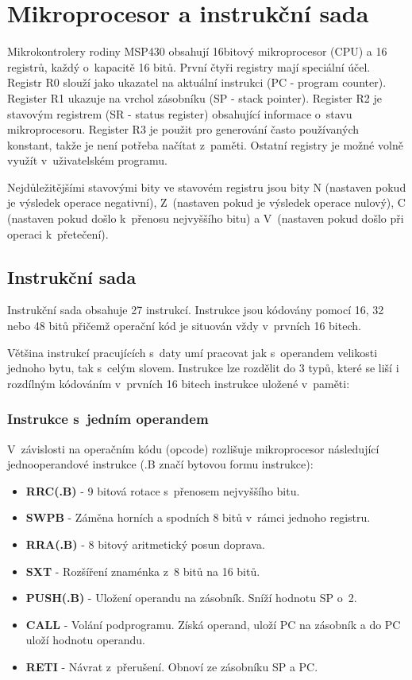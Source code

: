 \section{Mikroprocesor a instrukční sada}

Mikrokontrolery rodiny MSP430 obsahují 16bitový mikroprocesor (CPU) a 16 registrů, každý o~kapacitě 16 bitů. První čtyři registry mají speciální účel. Registr R0 slouží jako ukazatel na aktuální instrukci (PC - program counter). Register R1 ukazuje na vrchol zásobníku (SP - stack pointer). Register R2 je stavovým registrem (SR - status register) obsahující informace o~stavu mikroprocesoru. Register R3 je použit pro generování často používaných konstant, takže je není potřeba načítat z~paměti. Ostatní registry je možné volně využít v~uživatelském programu.

Nejdůležitějšími stavovými bity ve stavovém registru jsou bity N (nastaven pokud je výsledek operace negativní), Z~(nastaven pokud je výsledek operace nulový), C (nastaven pokud došlo k~přenosu nejvyššího bitu) a V~(nastaven pokud došlo při operaci k~přetečení).

\subsection{Instrukční sada}

Instrukční sada obsahuje 27 instrukcí. Instrukce jsou kódovány pomocí 16, 32 nebo 48 bitů přičemž operační kód je situován vždy v~prvních 16 bitech.

Většina instrukcí pracujících s~daty umí pracovat jak s~operandem velikosti jednoho bytu, tak s~celým slovem. Instrukce lze rozdělit do 3 typů, které se liší i rozdílným kódováním v~prvních 16 bitech instrukce uložené v~paměti:

\subsubsection{Instrukce s~jedním operandem}

V~závislosti na operačním kódu (opcode) rozlišuje mikroprocesor následující jednooperandové instrukce (.B značí bytovou formu instrukce):

\begin{itemize}
\item \textbf{RRC(.B)} - 9 bitová rotace s~přenosem nejvyššího bitu.
\item \textbf{SWPB} - Záměna horních a spodních 8 bitů v~rámci jednoho registru.
\item \textbf{RRA(.B)} - 8 bitový aritmetický posun doprava.
\item \textbf{SXT} - Rozšíření znaménka z~8 bitů na 16 bitů.
\item \textbf{PUSH(.B)} - Uložení operandu na zásobník. Sníží hodnotu SP o~2.
\item \textbf{CALL} - Volání podprogramu. Získá operand, uloží PC na zásobník a do PC uloží hodnotu operandu.
\item \textbf{RETI} - Návrat z~přerušení. Obnoví ze zásobníku SP a PC.
\end{itemize}

